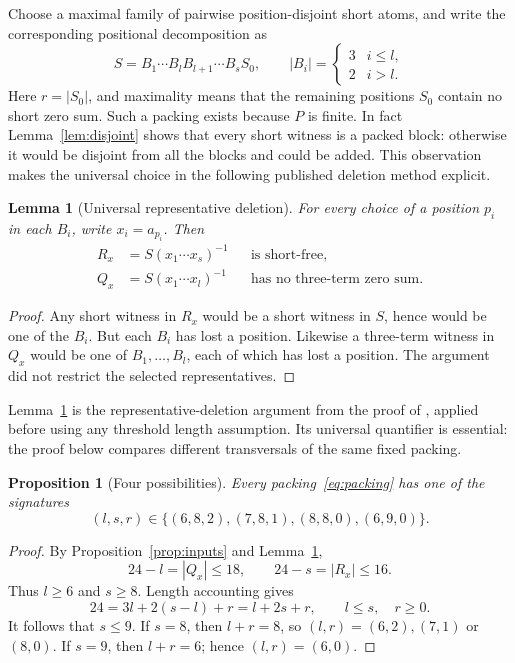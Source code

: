 \documentclass[11pt]{article}
\newtheorem{proposition}[theorem]{Proposition}
\newtheorem{lemma}[theorem]{Lemma}
\theoremstyle{definition}
\theoremstyle{remark}
\begin{document}
Choose a maximal family of pairwise position-disjoint short atoms, and
write the corresponding positional decomposition as
\begin{equation}\label{eq:packing}
 S=B_1\cdots B_l B_{l+1}\cdots B_s S_0,
 \qquad |B_i|=\begin{cases}3&i\leq l,\\2&i>l.\end{cases}
\end{equation}
Here $r=|S_0|$, and maximality means that the remaining positions $S_0$
contain no short zero sum. Such a packing exists because $P$ is finite.
In fact Lemma~\ref{lem:disjoint} shows that every short witness is a packed
block: otherwise it would be disjoint from all the blocks and could be added.
This observation makes the universal choice in the following published
deletion method explicit.

\begin{lemma}[Universal representative deletion]\label{lem:delete}
For every choice of a position $p_i$ in each $B_i$, write $x_i=a_{p_i}$.
Then
\begin{align}
 R_x&=S(x_1\cdots x_s)^{-1} &&\text{is short-free},\label{eq:all-delete}\\
 Q_x&=S(x_1\cdots x_l)^{-1} &&\text{has no three-term zero sum}.
 \label{eq:triple-delete}
\end{align}
\end{lemma}
\begin{proof}
Any short witness in $R_x$ would be a short witness in $S$, hence would
be one of the $B_i$. But each $B_i$ has lost a position.
Likewise a three-term witness in $Q_x$ would be one of
$B_1,\ldots,B_l$, each of which has lost a position.
The argument did not restrict the selected representatives.
\end{proof}

Lemma~\ref{lem:delete} is the representative-deletion argument from the
proof of \cite[Lemma 3.3(3)]{Gao2024}, applied before using any threshold
length assumption. Its universal quantifier is essential: the proof below
compares different transversals of the same fixed packing.

\begin{proposition}[Four possibilities]\label{prop:four}
Every packing~\eqref{eq:packing} has one of the signatures
\begin{equation}\label{eq:four}
 (l,s,r)\in\{(6,8,2),(7,8,1),(8,8,0),(6,9,0)\}.
\end{equation}
\end{proposition}
\begin{proof}
By Proposition~\ref{prop:inputs} and Lemma~\ref{lem:delete},
\[
          24-l=|Q_x|\leq18,\qquad 24-s=|R_x|\leq16.
\]
Thus $l\geq6$ and $s\geq8$. Length accounting gives
\begin{equation}\label{eq:budget}
        24=3l+2(s-l)+r=l+2s+r,\qquad l\leq s,\quad r\geq0.
\end{equation}
It follows that $s\leq9$. If $s=8$, then $l+r=8$, so
$(l,r)=(6,2),(7,1)$ or $(8,0)$. If $s=9$, then $l+r=6$;
hence $(l,r)=(6,0)$.
\end{proof}
\end{document}
